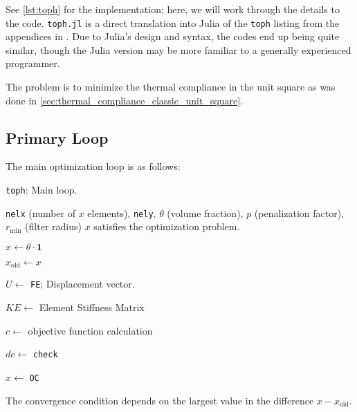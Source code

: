 See \autoref{lst:toph} for the implementation; here, we will work through the details to the code. \texttt{toph.jl}
is a direct translation
into Julia of the \texttt{toph} listing from the appendices in \cite{bendsoe_sigmund_topopt}. Due to Julia's
design and syntax, the codes end up being quite similar, though the Julia version may be more
familiar to a generally experienced programmer.

The problem is to minimize the thermal compliance in the unit square as was done in \autoref{sec:thermal_compliance_classic_unit_square}.




\subsection{Primary Loop}
The main optimization loop is as follows:
\begin{algorithm}
    \caption{\texttt{toph}: Main loop.}\label{alg:toph_main}
    \begin{algorithmic}
    \Require \texttt{nelx} (number of $x$ elements), \texttt{nely}, $\theta$ (volume fraction), $p$ (penalization factor), $r_{\text{min}}$ (filter radius)
    \Ensure $x$ satisfies the optimization problem.

    \State $x \gets \theta \cdot \mathbf{1}$ 


        $x_\text{old} \gets x$

        $U \gets$ \texttt{FE}; Displacement vector. 

        $KE \gets$ Element Stiffness Matrix

        $c \gets$ objective function calculation

        $dc \gets$ \texttt{check} 

        $x \gets$ \texttt{OC} 

    \EndWhile
    \end{algorithmic}
\end{algorithm}

The convergence condition depends on the largest value in the difference $x - x_\text{old}$.


